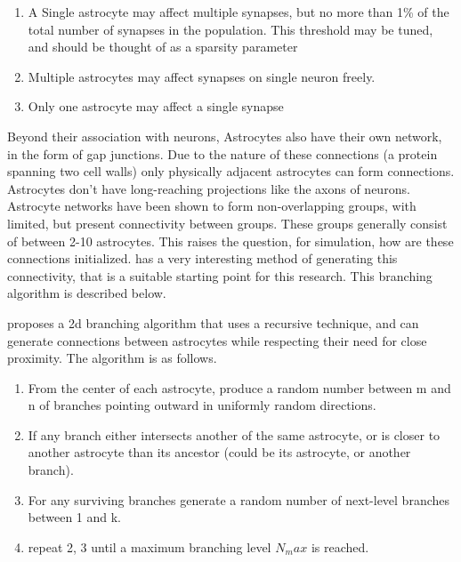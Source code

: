     \begin{enumerate}
        \item A Single astrocyte may affect multiple synapses, but no more than
          1\% of the total number of synapses in the population. This threshold
          may be tuned, and should be thought of as a sparsity parameter
        \item Multiple astrocytes may affect synapses on single neuron freely.
        \item Only one astrocyte may affect a single synapse
    \end{enumerate}
    
    Beyond their association with neurons, Astrocytes also have their own
    network, in the form of gap junctions. Due to the nature of these
    connections (a protein spanning two cell walls) only physically adjacent
    astrocytes can form connections. Astrocytes don't have long-reaching
    projections like the axons of neurons. Astrocyte networks have been shown to
    form non-overlapping groups, with limited, but present connectivity between
    groups. These groups generally consist of between 2-10 astrocytes. This
    raises the question, for simulation, how are these connections
    initialized. \cite{snn_dynamic_calcium} has a very interesting method of
    generating this connectivity, that is a suitable starting point for this
    research. This branching algorithm is described below.
    
    \cite{snn_dynamic_calcium} proposes a 2d branching algorithm that uses a
    recursive technique, and can generate connections between astrocytes while
    respecting their need for close proximity. The algorithm is as follows.
    \begin{enumerate}
        \item From the center of each astrocyte, produce a random number between
          m and n of branches pointing outward in uniformly random directions.
        \item If any branch either intersects another of the same astrocyte, or
          is closer to another astrocyte than its ancestor (could be its
          astrocyte, or another branch).\
        \item For any surviving branches generate a random number of next-level
          branches between 1 and k.
        \item repeat 2, 3 until a maximum branching level $N_max$ is reached.
    \end{enumerate}
    
